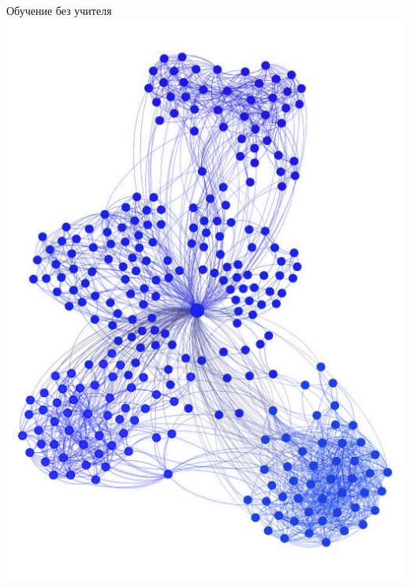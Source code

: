 \documentclass[10pt]{beamer}
\begin{document}
\begin{frame}{Обучение без учителя}
  \centering
  \includegraphics[width=0.9 \linewidth, height=0.9 \textheight, keepaspectratio]{images/clustering1}\\
\end{frame}
\end{document}

